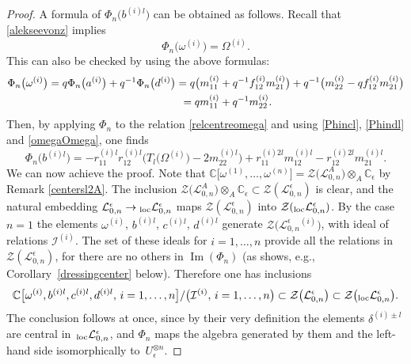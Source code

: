 \documentclass[pdftex]{sigma}%
\numberwithin{equation}{section}
\numberwithin{figure}{section}
\newcommand{\e}{\epsilon}
\newcommand{\mc}{\mathbb{C}}
\newcommand{\Ll}{{\mathcal L}}
\begin{document}
\begin{proof}
 A formula of $\Phi_n\big(b^{(i)l}\big)$ can be obtained as follows. Recall that \eqref{alekseevonz} implies
 \begin{equation}\label{omegaOmega}
\Phi_n\big(\omega^{(i)}\big) = \Omega^{(i)}.
\end{equation}
{\samepage
This can also be checked by using the above formulas:
\begin{gather*}
\Phi_n\big(\omega^{(i)}\big) = q\Phi_n\big(a^{(i)}\big)+q^{-1}\Phi_n\big(d^{(i)}\big)
= q\big(m_{11}^{(i)} + q^{-1}f_{12}^{(i)}m_{21}^{(i)}\big) + q^{-1}\big(m_{22}^{(i)} - qf_{12}^{(i)}m_{21}^{(i)}\big)
\\ \hphantom{\Phi_n\big(\omega^{(i)}\big)}
{} = qm_{11}^{(i)}+q^{-1}m_{22}^{(i)}.
\end{gather*}} \noindent
Then, by applying $\Phi_n$ to the relation \eqref{relcentreomega} and using \eqref{Phincl}, \eqref{Phindl} and \eqref{omegaOmega}, one finds
\begin{equation}\label{phinbl}
\Phi_n\big(b^{(i)l}\big) = -r_{11}^{(i)l}r_{12}^{(i)l}\big(T_l\big(\Omega^{(i)}\big) - 2 m_{22}^{(i)l}\big)+ r_{11}^{(i)2l}m_{12}^{(i)l}-r_{12}^{(i)2l}m_{21}^{(i)l}.
\end{equation}
We can now achieve the proof. Note that $\mc\big[\omega^{(1)},\dots,\omega^{(n)}\big] = \mathcal{Z}\big(\Ll_{0,n}^A\big) \otimes_A {\mathbb C}_{\e}$ by Remark \ref{centersl2A}. The inclusion $\mathcal{Z}\big(\Ll_{0,n}^A\big) \otimes_A {\mathbb C}_{\e}\subset \mathcal{Z}(\Ll_{0,n}^\e)$ is clear, and the natural embedding $\Ll_{0,n}^\e \rightarrow {}_{\rm loc}\Ll_{0,n}^\e$ maps $\mathcal{Z}(\Ll_{0,n}^\e)$ into $\mathcal{Z}({}_{\rm loc}\Ll_{0,n}^\e)$. By the case $n=1$ the elements $\omega^{(i)}$, $b^{(i)l}$, $c^{(i)l}$, $d^{(i) l}$ generate $\mathcal{Z}\big(\Ll_{0,n}^\e{}^{(i)}\big)$, with ideal of relations $\mathcal{I}^{(i)}$. The set of these ideals for $i=1,\dots,n$ provide all the relations in~$\mathcal{Z}(\Ll_{0,n}^\e)$, for there are no others in $\operatorname{Im}(\Phi_n)$ (as shows, e.g., Corollary~\ref{dressingcenter} below). Therefore one has inclusions
\[
\mc\big[\omega^{(i)},b^{(i)l},c^{(i)l},d^{(i)l},\, i=1,\dots, n\big]/\big(\mathcal{I}^{(i)},\, i=1,\dots, n\big) \subset \mathcal{Z}\big(\Ll_{0,n}^\e\big) \subset \mathcal{Z}\big({}_{\rm loc}\Ll_{0,n}^\e\big).
\]
The conclusion follows at once, since by their very definition the elements $\delta^{(i)\pm l}$ are central in~${}_{\rm loc}\Ll_{0,n}^\e{}$, and $\Phi_n$ maps the algebra generated by them and the left-hand side isomorphically to~$U_\epsilon^{\otimes n}$.\end{proof}
\end{document}

